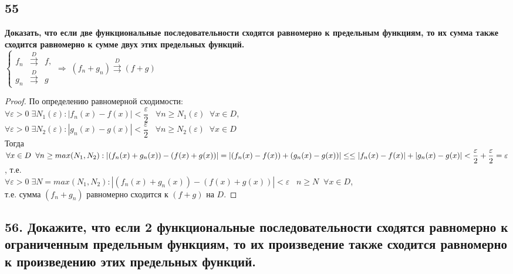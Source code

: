 \documentclass[a4paper, fleqn]{article}
\begin{document}
    \subsection*{55}
        \textbf{ Доказать, что если две функциональные последовательности сходятся равномерно к предельным функциям, то их сумма также сходится равномерно к сумме двух этих предельных функций.} \\[5 pt]
	$\left\{\begin{array}{lll} 
	f_n &\overset{D}{\rightrightarrows}& f, \\[5 pt]
	g_n &\overset{D}{\rightrightarrows}& g
	\end{array}\right. \Rightarrow \; (f_n + g_n) \overset{D}{\rightrightarrows} (f + g)$
	\begin{proof}
	По определению равномерной сходимости: \\[3 pt]
	$\forall \varepsilon > 0 \; \exists N_1(\varepsilon) : |f_n(x) - f(x)| < \dfrac{\varepsilon}2 \;\;\; \forall n \ge N_1(\varepsilon)\;\; \forall x \in D$, \\[3 pt]
	$\forall \varepsilon > 0 \; \exists N_2(\varepsilon) : |g_n(x) - g(x)| < \dfrac{\varepsilon}2 \;\;\; \forall n \ge N_2(\varepsilon)\;\; \forall x \in D$ \\[3 pt]
	Тогда \\[3 pt]
	$\forall x \in D \;\; \forall n \ge max(N_1, N_2) : |(f_n(x) + g_n(x)) - (f(x) + g(x))|  = |(f_n(x) - f(x)) + (g_n(x) - g(x))|  \le \\[3 pt]
	\le |f_n(x) - f(x)| + |g_n(x) - g(x)| < \dfrac{\varepsilon}2 + \dfrac{\varepsilon}2 = \varepsilon$, т.е. \\[3 pt]
	$\forall \varepsilon > 0 \; \exists N = max(N_1, N_2) : |(f_n(x) + g_n(x)) - (f(x) + g(x))| < \varepsilon \;\;\; n \ge N \;\; \forall x \in D$, \\[5 pt]
	т.е. сумма $(f_n + g_n)$ равномерно сходится к $(f + g)$ на $D$.
	\end{proof}    
    
    \subsection*{56. Докажите, что если 2 функциональные последовательности сходятся равномерно к ограниченным предельным функциям, то их произведение также сходится равномерно к произведению этих предельных функций.}
        
\end{document}
